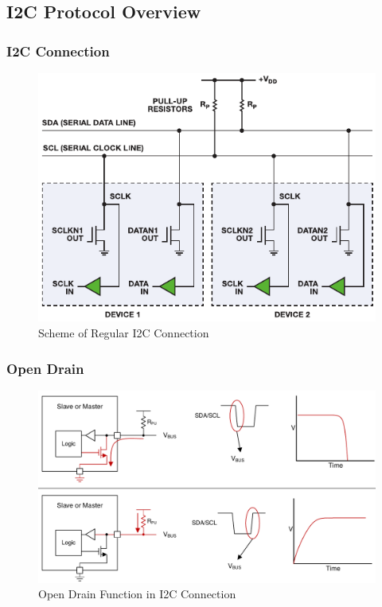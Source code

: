 \documentclass[aspectratio=169,usenames,dvipsnames]{beamer}
\begin{document}
\subsection{I2C Protocol Overview}

\begin{frame}
  \frametitle{I2C Connection}
  \begin{figure}
    \centering
    \includegraphics[scale=0.9]{images/i2c-connection.pdf}
    \caption{Scheme of Regular I2C Connection}
  \end{figure}
  \vspace*{-10mm}
\end{frame}

\begin{frame}
  \frametitle{Open Drain}
  \begin{figure}
    \centering
    \includegraphics[scale=0.3]{images/open-drain.png}
    \caption{Open Drain Function in I2C Connection}
  \end{figure}
  \vspace*{-10mm}
\end{frame}
\end{document}

